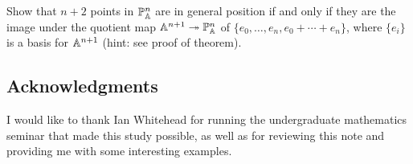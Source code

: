 \documentclass{../../mathnotes}
\begin{document}
\begin{exc}
    Show that $n+2$ points in $\mathbb{P}^n_{\mathbb{A}}$ are in general position if and only if they are the image under the quotient
    map $\mathbb{A}^{n+1}\twoheadrightarrow\mathbb{P}^n_{\mathbb{A}}$ of $\{e_0,\ldots,e_n,e_0+\cdots+e_n\}$, where $\{e_i\}$ is a basis for $\mathbb{A}^{n+1}$
    (hint: see proof of theorem).
\end{exc}

\subsection*{Acknowledgments}

I would like to thank Ian Whitehead for running the undergraduate mathematics seminar that made this study possible,
as well as for reviewing this note and providing me with some interesting examples.
\end{document}
